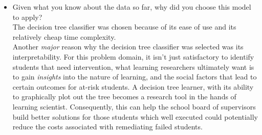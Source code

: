 \documentclass[12pt]{article}
\begin{document}
\begin{itemize}
\item Given what you know about the data so far, why did you choose this model to apply?\\
The decision tree classifier was chosen because of its ease of use and its relatively cheap time complexity.\\
Another \textit{major} reason why the decision tree classifier was selected was its interpretability. For this problem domain, it isn't just satisfactory to identify students that need intervention, what learning researchers ultimately want is to gain \textit{insights} into the nature of learning, and the social factors that lead to certain outcomes for at-risk students. A decision tree learner, with its ability to graphically plot out the tree becomes a research tool in the hands of learning scientist. Consequently, this can help the school board of supervisors build better solutions for those students which well executed could potentially reduce the costs associated with remediating failed students.
\end{itemize} 




\end{document}
